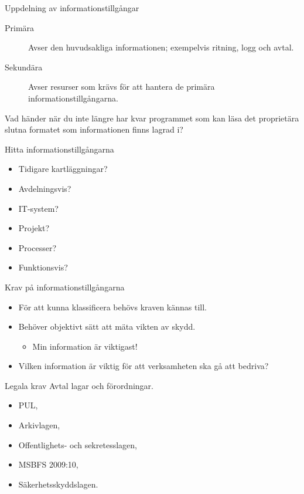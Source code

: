 \documentclass{beamer}
\begin{document}
\begin{frame}{Uppdelning av informationstillgångar}
  \begin{description}
    \item[Primära] Avser den huvudsakliga informationen; exempelvis ritning, 
      logg och avtal.

    \item[Sekundära] Avser resurser som krävs för att hantera de primära 
      informationstillgångarna.

  \end{description}
  Vad händer när du inte längre har kvar programmet som kan läsa det 
  proprietära slutna formatet som informationen finns lagrad i?
\end{frame}

\begin{frame}{Hitta informationstillgångarna}
  \begin{itemize}
    \item Tidigare kartläggningar?
    \item Avdelningsvis?
    \item IT-system?
    \item Projekt?
    \item Processer?
    \item Funktionsvis?
  \end{itemize}
\end{frame}

\begin{frame}{Krav på informationstillgångarna}
  \begin{itemize}
    \item För att kunna klassificera behövs kraven kännas till.

    \item Behöver objektivt sätt att mäta vikten av skydd.
      \begin{itemize}
        \item Min information är viktigast!
      \end{itemize}

    \item Vilken information är viktig för att verksamheten ska gå att bedriva?

  \end{itemize}
\end{frame}

\begin{frame}{Legala krav}
  Avtal lagar och förordningar.
  \begin{itemize}
    \item PUL,
    \item Arkivlagen,
    \item Offentlighets- och sekretesslagen,
    \item MSBFS 2009:10,
    \item Säkerhetsskyddslagen.
  \end{itemize}
\end{frame}
\end{document}
